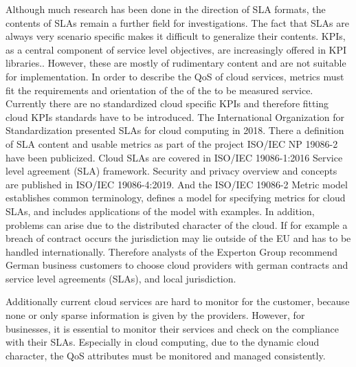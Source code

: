 Although much research has been done in the direction of SLA formats, the contents of SLAs remain a further field for investigations. The fact that SLAs are always very scenario specific makes it difficult to generalize their contents. KPIs, as a central component of service level objectives, are increasingly offered in KPI libraries.\cite{KPI}. However, these are mostly of rudimentary content and are not suitable for implementation. In order to describe the QoS of cloud services, metrics must fit the requirements and orientation of the of the to be measured service. Currently there are no standardized cloud specific KPIs and therefore fitting cloud KPIs standards have to be introduced. The International Organization for Standardization presented SLAs for cloud computing in 2018. There a definition of SLA content and usable metrics as part of the project ISO/IEC NP 19086-2 \cite{ISOnew} have been publicized. Cloud SLAs are covered in ISO/IEC 19086-1:2016 Service level agreement (SLA) framework. Security and privacy overview and concepts are published in ISO/IEC 19086-4:2019. And the ISO/IEC 19086-2 Metric model establishes common terminology, defines a model for specifying metrics for cloud SLAs, and includes applications of the model with examples.  In addition, problems can arise due to the distributed character of the cloud. If for example a breach of contract occurs the jurisdiction may lie outside of the EU and has to be handled internationally. Therefore analysts of the Experton Group \cite{Experton} recommend German business customers to choose cloud providers with german contracts and service level agreements (SLAs), and local jurisdiction. 

Additionally current cloud services are hard to monitor for the customer, because none or only sparse information is given by the providers. However, for businesses, it is essential to monitor their services and check on the compliance with their SLAs. Especially in cloud computing, due to the dynamic cloud character, the QoS attributes must be monitored and managed consistently.\cite{wsla}



